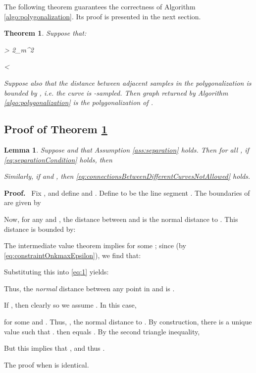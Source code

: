 \documentclass{article}
\newenvironment{proof}{
  \noindent\textbf{Proof.}\ }{\hspace*{\fill}
  \medskip}
\newtheorem{lemma}[cntr]{Lemma}
\newtheorem{theorem}[cntr]{Theorem}
\numberwithin{cntr}{section}
\numberwithin{equation}{section}
\newcommand{\curvemax}{{\kappa_{m}}}
\newcommand{\curvesep}{{\delta}}
\begin{document}
The following theorem guarantees the correctness of
Algorithm \ref{algo:polygonalization}. Its proof is presented
in the next section.

\begin{theorem}
  \label{thm:proofOfAlgo}
  Suppose that:
  
      \label{eq:constraintOnSeparationSampling}
      \curvesep > 2\curvemax \epsilon^{2}
    
      \label{eq:constraintOnkmaxEpsilon}
      \epsilon < \frac{1}{ \curvemax \sqrt{2}}
    
  Suppose also that the distance between adjacent samples in the polygonalization is bounded by , i.e. the curve is -sampled. Then graph  returned by Algorithm \ref{algo:polygonalization} is the polygonalization of .
\end{theorem}

\subsection{Proof of Theorem \ref{thm:proofOfAlgo}}

\begin{lemma}
  \label{lem:separationAllowedRegions}
  Suppose  and that Assumption \ref{ass:separation} holds.
Then for all , if \eqref{eq:separationCondition} holds, then
  
  Similarly, if  and , then \eqref{eq:connectionsBetweenDifferentCurvesNotAllowed} holds.
\end{lemma}
\begin{proof}
  Fix , and define  and . Define  to be the line segment . The boundaries of  are given by

Now, for any  and , the distance between  and  is the normal distance to . This distance is bounded by:

The intermediate value theorem implies  for some ; since  (by \eqref{eq:constraintOnkmaxEpsilon}), we find that:

Substituting this into \eqref{eq:1} yields:

Thus, the \emph{normal} distance between any point in  and  is .

If ,
then clearly 
so we assume . In this case,

for some 
and .
Thus, ,
the normal distance to . By construction, there is a unique
value  such that
.
 then equals .
By the second triangle inequality,

But this implies that , and thus .

The proof when  is identical.
\end{proof}
\end{document}
